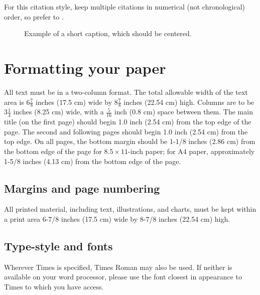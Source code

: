 \documentclass[10pt,twocolumn,letterpaper]{article}
\begin{document}
For this citation style, keep multiple citations in numerical (not chronological) order, so prefer \cite{Alpher03,Alpher02,Authors11} to \cite{Alpher02,Alpher03,Authors11}.


\begin{figure*}
\begin{center}
\fbox{\rule{0pt}{2in} \rule{.9\linewidth}{0pt}}
\end{center}
   \caption{Example of a short caption, which should be centered.}
\label{fig:short}
\end{figure*}

\section{Formatting your paper}

All text must be in a two-column format. The total allowable width of the text area is $6\frac78$ inches (17.5 cm) wide by $8\frac78$ inches (22.54 cm) high. Columns are to be $3\frac14$ inches (8.25 cm) wide, with a $\frac{5}{16}$ inch (0.8 cm) space between them. The main title (on the first page) should begin 1.0 inch (2.54 cm) from the top edge of the page. The second and following pages should begin 1.0 inch (2.54 cm) from the top edge. On all pages, the bottom margin should be 1-1/8 inches (2.86 cm) from the bottom edge of the page for $8.5 \times 11$-inch paper; for A4 paper, approximately 1-5/8 inches (4.13 cm) from the bottom edge of the page.

\subsection{Margins and page numbering}

All printed material, including text, illustrations, and charts, must be kept within a print area 6-7/8 inches (17.5 cm) wide by 8-7/8 inches (22.54 cm) high.


\subsection{Type-style and fonts}

Wherever Times is specified, Times Roman may also be used. If neither is available on your word processor, please use the font closest in appearance to Times to which you have access.
\end{document}
